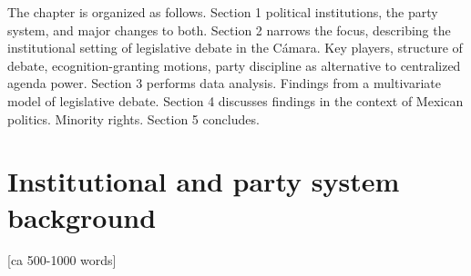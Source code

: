 \documentclass[letter,12pt]{article}
\begin{document}

The chapter is organized as follows. Section 1 political institutions, the party system, and major changes to both. Section 2 narrows the focus, describing the institutional setting of legislative debate in the Cámara. Key players, structure of debate, ecognition-granting motions, party discipline as alternative to centralized agenda power. Section 3 performs data analysis. Findings from a multivariate model of legislative debate. Section 4 discusses findings in the context of Mexican politics. Minority rights. Section 5 concludes. 



\section{Institutional and party system background} [ca 500-1000 words]




\end{document}
